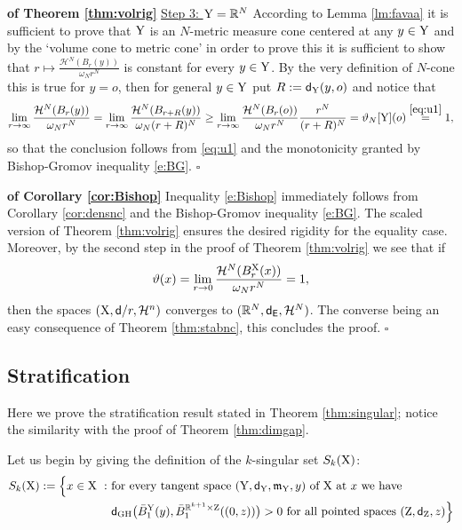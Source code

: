 \documentclass[reqno,11pt]{article}
\numberwithin{equation}{section}
\newcommand{\R}{\mathbb{R}}
\newcommand{\Z}{\mathbb{Z}}
\newcommand{\mm}{{\mbox{\boldmath$m$}}}
\newcommand{\sfd}{{\sf d}}
\renewcommand{\mm}{\mathfrak m}                                %
\newenvironment{proofb}{\removelastskip\par\medskip   %
\noindent{\em{\bf Proof}} \rm}{\penalty-20\null\hfill$\square$\par\medbreak}
\newcommand{\X}{{\rm X}}
\newcommand{\Y}{{\rm Y}}
\renewcommand{\Z}{{\rm Z}}
\newcommand{\Eu}{{\sf E}}
\newcommand{\HH}{{\mathcal H}}
\begin{document}
\begin{proofb}{\bf of Theorem \ref{thm:volrig}}
\noindent\underline{Step 3: $\Y=\R^N$} According to Lemma \ref{lm:favaa} it is sufficient to prove that  $\Y$ is an $N$-metric measure cone centered at any $y\in\Y$ and by the  `volume cone to metric cone' \cite[Theorem 1.1]{DPG16} in order to prove this it is sufficient to show that $r\mapsto\frac{\HH^N(B_r(y))}{\omega_Nr^N}$ is constant for every $y\in\Y$. By the very definition of $N$-cone this is true for $y=o$, then for general $y\in\Y$ put $R:=\sfd_\Y(y,o)$ and notice that
\[
\begin{split}
\lim_{r\to\infty}\frac{\HH^N(B_r(y))}{\omega_Nr^N}= \lim_{r\to\infty}\frac{\HH^N(B_{r+R}(y))}{\omega_N(r+R)^N}\geq \lim_{r\to\infty}\frac{\HH^N(B_{r}(o))}{\omega_Nr^N}\frac{r^N}{(r+R)^N}=\vartheta_N[\Y](o)\stackrel{\eqref{eq:u1}}=1,
\end{split}
\]
so that the conclusion follows from \eqref{eq:u1} and the monotonicity granted by Bishop-Gromov inequality \eqref{e:BG}.
\end{proofb}

{
\begin{proofb}{\bf of Corollary \ref{cor:Bishop}}
Inequality \eqref{e:Bishop} immediately follows from Corollary \ref{cor:densnc} and the Bishop-Gromov inequality \eqref{e:BG}. The scaled version of Theorem \ref{thm:volrig}  ensures the desired rigidity for the equality case. Moreover, by the second step in the proof of  Theorem \eqref{thm:volrig} we see that if
\[
\vartheta(x)=\lim_{r \to 0} \frac{\HH^N(B_r^\X(x))}{\omega_Nr^N}=1,
\]
then the spaces \((\X,\sfd/r, \HH^n)\) converges to \((\R^N, \sfd_{\Eu}, \HH^N)\). The converse being an easy consequence of Theorem \ref{thm:stabnc}, this concludes the proof.
\end{proofb}
}

\subsection{Stratification}

Here we prove  the stratification result stated in Theorem \ref{thm:singular}; notice the similarity with the proof of Theorem \ref{thm:dimgap}. 

Let us begin by giving the definition of the $k$-singular set $S_k(\X)$:
\begin{equation}
\label{eq:essek}
\begin{split}
S_k(\X):=\Big\{x\in\X\ :\ &\text{for every tangent space $(\Y,\sfd_\Y,\mm_\Y,y)$ of $\X$ at $x$ we have}\\
&\text{$\sfd_{\rm GH}\big(\bar B_1^\Y(y),\bar B^{\R^{k+1}\times\Z}_1((0,z))\big)>0$ for  all pointed spaces $(\Z,\sfd_\Z,z)$}\Big\}
\end{split}
\end{equation}
\end{document}
